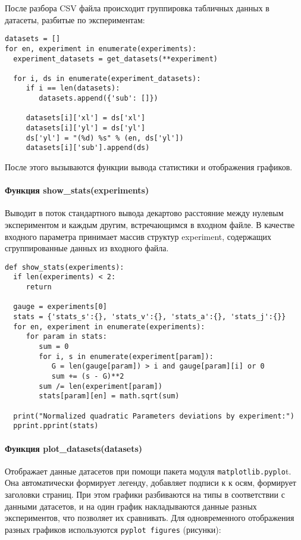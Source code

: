 После разбора CSV файла происходит группировка табличных данных в датасеты, разбитые по экспериментам:

\begin{lstlisting}[style=pythonstyle,caption={  }, label=lst:func:1]
datasets = []
for en, experiment in enumerate(experiments):
  experiment_datasets = get_datasets(**experiment)

  for i, ds in enumerate(experiment_datasets):
     if i == len(datasets):
        datasets.append({'sub': []})

     datasets[i]['xl'] = ds['xl']
     datasets[i]['yl'] = ds['yl']
     ds['yl'] = "(%d) %s" % (en, ds['yl'])
     datasets[i]['sub'].append(ds)
\end{lstlisting}

После этого вызываются функции вывода статистики и отображения графиков.

\paragraph{Функция show\_stats(experiments)}

Выводит в поток стандартного вывода декартово расстояние между нулевым экспериментом и каждым другим, встречающимся в входном файле. В качестве входного параметра принимает массив структур experiment, содержащих сгруппированные данных из входного файла.

\begin{lstlisting}[style=pythonstyle,caption={  }, label=lst:func:1]
  def show_stats(experiments):
  if len(experiments) < 2:
     return

  gauge = experiments[0]
  stats = {'stats_s':{}, 'stats_v':{}, 'stats_a':{}, 'stats_j':{}}
  for en, experiment in enumerate(experiments):
     for param in stats:
        sum = 0
        for i, s in enumerate(experiment[param]):
           G = len(gauge[param]) > i and gauge[param][i] or 0
           sum += (s - G)**2
        sum /= len(experiment[param])
        stats[param][en] = math.sqrt(sum)

  print("Normalized quadratic Parameters deviations by experiment:")
  pprint.pprint(stats)
\end{lstlisting}



\paragraph{Функция plot\_datasets(datasets)}

    Отображает данные датасетов при помощи пакета модуля \lstinline!matplotlib.pyplo!t. Она автоматически формирует легенду, добавляет подписи к к осям, формирует заголовки страниц. При этом графики разбиваются на типы в соответствии с данными датасетов, и на один график накладываются данные разных экспериментов, что позволяет их сравнивать. Для одновременного отображения разных графиков используются \lstinline!pyplot figures! (рисунки):

